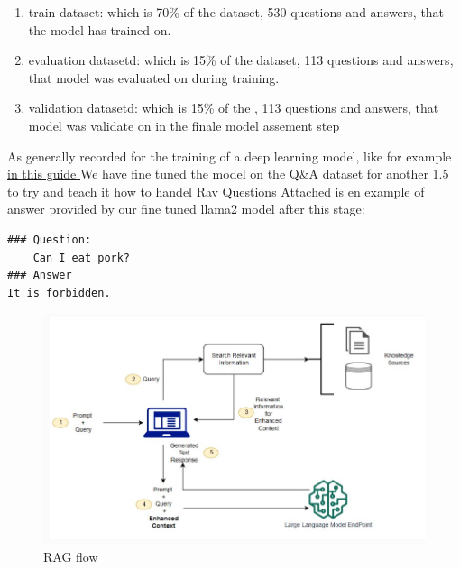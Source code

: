 \documentclass[11pt]{article}
\begin{document}
\begin{enumerate}
    \item train dataset: which is 70\% of the dataset, 530 questions and answers, that the model has trained on.
    \item evaluation datasetd: which is 15\% of the dataset, 113 questions and answers, that model was evaluated on during training.
    \item validation datasetd: which is 15\% of the , 113 questions and answers, that model was validate on in the finale model assement step 
\end{enumerate}
As generally recorded for the training of a deep learning model, like for example \href{https://encord.com/blog/train-val-test-split/#:~:text=Training%2C%20Validation%2C%20and%20Test%20Set%3A%20Key%20Takeaways,-Here%20are%20the&text=The%20optimal%20split%20ratio%20depends,10%2D20%25%20test%20data. }{in this guide }
We have fine tuned the model on the Q&A dataset for another 1.5 to try and teach it how to handel Rav Questions
Attached is en example of answer provided by our fine tuned llama2 model after this stage:
\begin{verbatim}
### Question:
    Can I eat pork?
### Answer
It is forbidden.
\end{verbatim}

\begin{figure}
    \centering
    \includegraphics[width=1\linewidth]{RAG_flow.png}
    \caption{RAG flow}
    \label{fig:RAG_flowl}
\end{figure}
   
\end{document}
